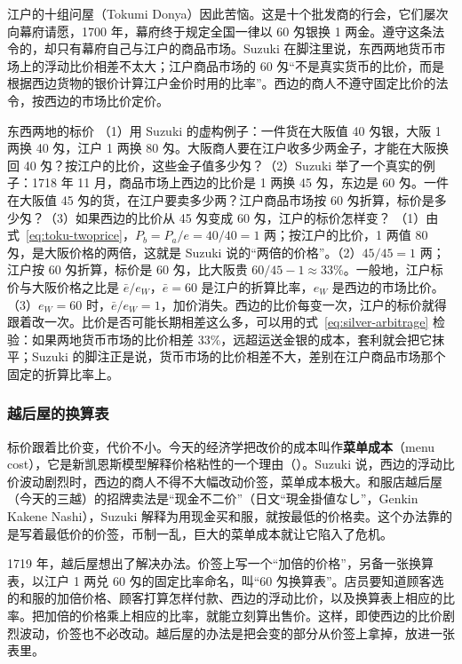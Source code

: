 江户的十组问屋（Tokumi Donya）因此苦恼。这是十个批发商的行会，它们屡次向幕府请愿，1700 年，幕府终于规定全国一律以 60 匁银换 1 两金\cite{suzuki2021}。遵守这条法令的，却只有幕府自己与江户的商品市场。Suzuki 在脚注里说，东西两地货币市场上的浮动比价相差不太大；江户商品市场的 60 匁“不是真实货币的比价，而是根据西边货物的银价计算江户金价时用的比率”\cite{suzuki2021}。西边的商人不遵守固定比价的法令，按西边的市场比价定价\cite{suzuki2021}。

\begin{example}{东西两地的标价}\label{ex:toku-eastwest}
（1）用 Suzuki 的虚构例子：一件货在大阪值 40 匁银，大阪 1 两换 40 匁，江户 1 两换 80 匁。大阪商人要在江户收多少两金子，才能在大阪换回 40 匁？按江户的比价，这些金子值多少匁？（2）Suzuki 举了一个真实的例子：1718 年 11 月，商品市场上西边的比价是 1 两换 45 匁，东边是 60 匁\cite{suzuki2021}。一件在大阪值 45 匁的货，在江户要卖多少两？江户商品市场按 60 匁折算，标价是多少匁？（3）如果西边的比价从 45 匁变成 60 匁，江户的标价怎样变？
\solution （1）由式~\eqref{eq:toku-twoprice}，$P_b=P_a/e=40/40=1$ 两；按江户的比价，1 两值 80 匁，是大阪价格的两倍，这就是 Suzuki 说的“两倍的价格”。（2）$45/45=1$ 两；江户按 60 匁折算，标价是 60 匁，比大阪贵 $60/45-1\approx33\%$。一般地，江户标价与大阪价格之比是 $\bar e/e_W$，$\bar e=60$ 是江户的折算比率，$e_W$ 是西边的市场比价。（3）$e_W=60$ 时，$\bar e/e_W=1$，加价消失。西边的比价每变一次，江户的标价就得跟着改一次。比价是否可能长期相差这么多，可以用的式~\eqref{eq:silver-arbitrage} 检验：如果两地货币市场的比价相差 33\%，远超运送金银的成本，套利就会把它抹平；Suzuki 的脚注正是说，货币市场的比价相差不大，差别在江户商品市场那个固定的折算比率上。
\end{example}

\subsubsection{越后屋的换算表}
标价跟着比价变，代价不小。今天的经济学把改价的成本叫作\textbf{菜单成本}（menu cost），它是新凯恩斯模型解释价格粘性的一个理由（）。Suzuki 说，西边的浮动比价波动剧烈时，西边的商人不得不大幅改动价签，菜单成本极大\cite{suzuki2021}。和服店越后屋（今天的三越）的招牌卖法是“现金不二价”（日文“現金掛値なし”，Genkin Kakene Nashi），Suzuki 解释为用现金买和服，就按最低的价格卖。这个办法靠的是写着最低价的价签，币制一乱，巨大的菜单成本就让它陷入了危机\cite{suzuki2021}。

1719 年，越后屋想出了解决办法。价签上写一个“加倍的价格”，另备一张换算表，以江户 1 两兑 60 匁的固定比率命名，叫“60 匁换算表”。店员要知道顾客选的和服的加倍价格、顾客打算怎样付款、西边的浮动比价，以及换算表上相应的比率。把加倍的价格乘上相应的比率，就能立刻算出售价\cite{suzuki2021}。这样，即使西边的比价剧烈波动，价签也不必改动\cite{suzuki2021}。越后屋的办法是把会变的部分从价签上拿掉，放进一张表里。

